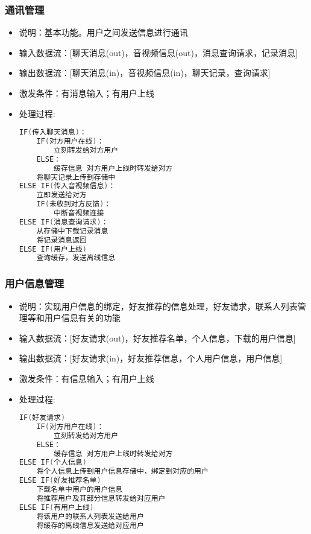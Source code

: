 \begin{itemize}
            \subsubsection{通讯管理}
            \begin{itemize}
                \item 说明：基本功能。用户之间发送信息进行通讯
                \item 输入数据流：[聊天消息(out)，音视频信息(out)，消息查询请求，记录消息]
                \item 输出数据流：[聊天消息(in)，音视频信息(in)，聊天记录，查询请求]
                \item 激发条件：有消息输入；有用户上线
                \item 处理过程: 
\begin{lstlisting}[language=C, caption=通讯管理, label={code:first-code}]
IF(传入聊天消息)：
    IF(对方用户在线)：
        立刻转发给对方用户
    ELSE：
        缓存信息 对方用户上线时转发给对方
    将聊天记录上传到存储中
ELSE IF(传入音视频信息)：
    立即发送给对方
    IF(未收到对方反馈)：
        中断音视频连接
ELSE IF(消息查询请求)：
    从存储中下载记录消息
    将记录消息返回
ELSE IF(用户上线)
    查询缓存，发送离线信息
\end{lstlisting}
            \end{itemize}
            \subsubsection{用户信息管理}
            \begin{itemize}
                \item 说明：实现用户信息的绑定，好友推荐的信息处理，好友请求，联系人列表管理等和用户信息有关的功能
                \item 输入数据流：[好友请求(out)，好友推荐名单，个人信息，下载的用户信息]
                \item 输出数据流：[好友请求(in)，好友推荐信息，个人用户信息，用户信息]
                \item 激发条件：有信息输入；有用户上线
                \item 处理过程: 
\begin{lstlisting}[language=C, caption=用户信息管理, label={code:first-code}]
IF(好友请求)
    IF(对方用户在线)：
        立刻转发给对方用户
    ELSE：
        缓存信息 对方用户上线时转发给对方
ELSE IF(个人信息)
    将个人信息上传到用户信息存储中，绑定到对应的用户
ELSE IF(好友推荐名单)
    下载名单中用户的用户信息
    将推荐用户及其部分信息转发给对应用户
ELSE IF(有用户上线)
    将该用户的联系人列表发送给用户
    将缓存的离线信息发送给对应用户
\end{lstlisting}
             \end{itemize}

\end{itemize}

